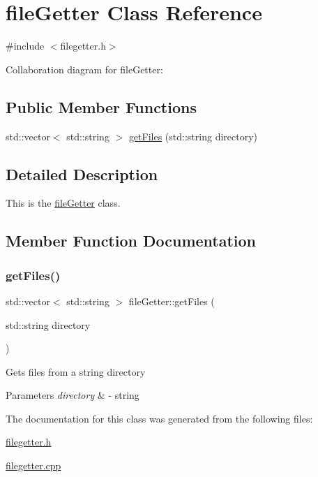 \hypertarget{classfileGetter}{}\section{file\+Getter Class Reference}
\label{classfileGetter}


{\ttfamily \#include $<$filegetter.\+h$>$}



Collaboration diagram for file\+Getter\+:
\subsection*{Public Member Functions}
\begin{DoxyCompactItemize}
\item 
std\+::vector$<$ std\+::string $>$ \hyperlink{classfileGetter_a2ab6fdcd4ae9377b24f51c35497dfd49}{get\+Files} (std\+::string directory)
\end{DoxyCompactItemize}


\subsection{Detailed Description}
This is the \hyperlink{classfileGetter}{file\+Getter} class. 

\subsection{Member Function Documentation}
\mbox{\label{classfileGetter_a2ab6fdcd4ae9377b24f51c35497dfd49}} 
\subsubsection{\texorpdfstring{get\+Files()}{getFiles()}}
{\footnotesize\ttfamily std\+::vector$<$ std\+::string $>$ file\+Getter\+::get\+Files (\begin{DoxyParamCaption}\item[{std\+::string}]{directory }\end{DoxyParamCaption})}

Gets files from a string directory 
\begin{DoxyParams}{Parameters}
{\em directory} & -\/ string \\
\hline
\end{DoxyParams}


The documentation for this class was generated from the following files\+:\begin{DoxyCompactItemize}
\item 
\hyperlink{filegetter_8h}{filegetter.\+h}\item 
\hyperlink{filegetter_8cpp}{filegetter.\+cpp}\end{DoxyCompactItemize}

